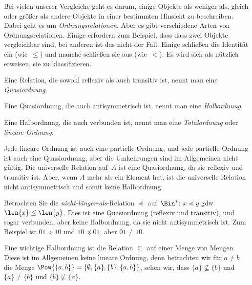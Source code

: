 \documentclass[../../../include/open-logic-section]{subfiles}
\begin{document}

\begin{explain}
Bei vielen unserer Vergleiche geht es darum, einige Objekte als
\glqq weniger als\grqq{}, \glqq gleich\grqq{} oder \glqq größer als\grqq{}
andere Objekte in einer bestimmten Hinsicht zu beschreiben.
Dabei geht es um \emph{Ordnungsrelationen}. Aber es gibt
verschiedene Arten von Ordnungsrelationen. Einige erfordern zum Beispiel, dass
dass zwei Objekte vergleichbar sind, bei anderen ist das nicht der Fall. Einige schließen die Identität
ein (wie~$\le$) und manche schließen sie aus (wie~$<$). Es wird sich als nützlich erweisen,
sie zu klassifizieren.
\end{explain}

\begin{defn}[Quasiordnung]
Eine Relation, die sowohl reflexiv als auch transitiv ist, nennt man eine
\emph{Quasiordnung}. 
\end{defn}

\begin{defn}[Halbordnung]
Eine Quasiordnung, die auch antisymmetrisch ist, nennt man eine
\emph{Halbordnung}.
\end{defn}

\begin{defn}[Totalordnung]
Eine Halbordnung, die auch verbunden ist, nennt man eine
\emph{Totalordnung} oder \emph{lineare Ordnung}.
\end{defn}

\begin{ex}
Jede lineare Ordnung ist auch eine partielle Ordnung, und jede partielle Ordnung ist
auch eine Quasiordnung, aber die Umkehrungen sind im Allgemeinen nicht gültig.
Die universelle Relation
auf~$A$ ist eine Quasiordnung, da sie reflexiv und transitiv ist. Aber, wenn
$A$ mehr als ein Element hat, ist die universelle Relation nicht
antisymmetrisch und somit keine Halbordnung.
\end{ex}

\begin{ex}
Betrachten Sie die \emph{nicht-länger-als}-Relation $\preccurlyeq$
auf~$\Bin^*$: $x \preccurlyeq y$ gdw $\len{x} \le \len{y}$. Dies ist eine
Quasiordnung (reflexiv und transitiv), und sogar verbunden, aber keine
Halbordnung, da sie nicht antisymmetrisch ist. Zum Beispiel ist $01
\preccurlyeq 10$ und $10 \preccurlyeq 01$, aber $01 \neq 10$.
\end{ex}

\begin{ex}
Eine wichtige Halbordnung ist die Relation $\subseteq$ auf einer Menge von
Mengen. Diese ist im Allgemeinen keine lineare Ordnung, denn betrachten wir für $a \neq b$ die Menge
$\Pow{\{a, b\}} = \{\emptyset, \{a\}, \{b\}, \{a,b\}\}$,
sehen wir, dass $\{a\} \nsubseteq \{b\}$ und $\{a\} \neq \{b\}$ und $\{b\}
\nsubseteq \{a\}$.
\end{ex}
\end{document}
